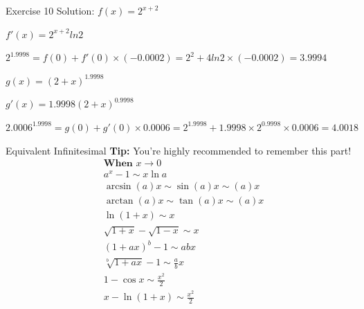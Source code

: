 \documentclass{beamer}
\begin{document}
\begin{frame}{Exercise 10}
Solution:
$f(x) = 2^{x+2}$

$f'(x) = 2^{x+2}ln2$

$2^{1.9998} = f(0) + f'(0) \times (-0.0002) =  2^2 + 4ln2 \times (-0.0002) = 3.9994$

$g(x) = (2+x)^{1.9998}$

$g'(x) = 1.9998(2+x)^{0.9998}$

$2.0006^{1.9998} = g(0) + g'(0)\times 0.0006 = 2^{1.9998} + 1.9998\times 2^{0.9998}\times 0.0006 = 4.0018$
    
\end{frame}
\begin{frame}{Equivalent Infinitesimal}
\textbf{Tip:} You're highly recommended to remember this part!
    $$
\begin{aligned}
&\textbf{When } x \rightarrow 0\\
&a^{x}-1 \sim x \ln a \\
&\arcsin (a) x \sim \sin (a) x \sim(a) x \\
&\arctan (a) x \sim \tan (a) x \sim(a) x \\
&\ln (1+x) \sim x \\
&\sqrt{1+x}-\sqrt{1-x} \sim x \\
&(1+a x)^{b}-1 \sim a b x \\
&\sqrt[b]{1+a x}-1 \sim \frac{a}{b} x \\
&1-\cos x \sim \frac{x^{2}}{2} \\
&x-\ln (1+x) \sim \frac{x^{2}}{2} \\
\end{aligned}
$$
\end{frame}
\end{document}
